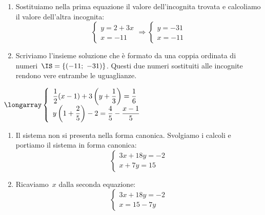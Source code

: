 \begin{exrig}
\begin{enumerate}
 \item Sostituiamo nella prima equazione il valore dell'incognita trovata e 
calcoliamo il valore dell'altra incognita:
\[ \left\{\begin{array}{l}y=2+3x\\
         x=-11
  \end{array}\right.\Rightarrow
  \left\{\begin{array}{l}
         y=-31\\
         x=-11
  \end{array}\right.\]

 \item Scriviamo l'insieme soluzione che è formato da una coppia ordinata 
 di numeri~$\IS=\{(-11;~-31)\}$. Questi due numeri sostituiti alle incognite 
 rendono vere entrambe le uguaglianze.
\end{enumerate}

\begin{esempio}
$\longarray\left\{\begin{array}{l}
  \dfrac{1}{2}(x-1)+3\left(y+\dfrac{1}{3}\right)=\dfrac{1}{6}\\
  y\left(1+\dfrac{2}{5}\right)-2=\dfrac{4}{5}-\dfrac{x-1}{5}
  \end{array}\right.$

\begin{enumerate}
 \item Il sistema non si presenta nella forma canonica. Svolgiamo i calcoli e 
portiamo il sistema in forma canonica:
\[\left\{\begin{array}{l}3x+18y=-2\\x+7y=15\end{array}\right.\]

\item Ricaviamo~$x$ dalla seconda equazione:
\[\left\{\begin{array}{l}3x+18y=-2\\x=15-7y\end{array}\right.\]


\end{enumerate}
\end{esempio}
\end{exrig}

